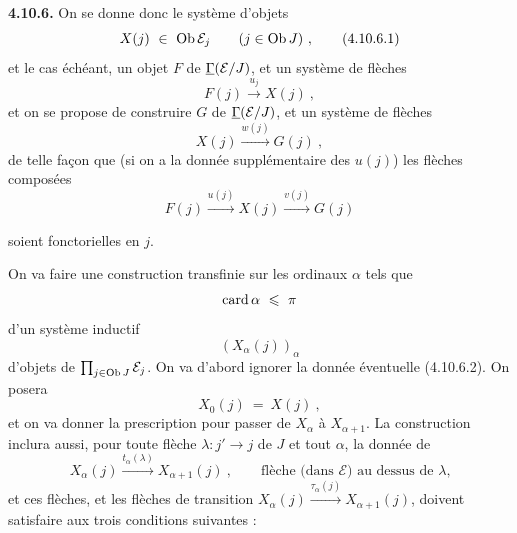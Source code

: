 \textbf{4.10.6.} On se donne donc le système d'objets
\[
X(j)\ \in\ \operatorname{Ob}\mathcal{E}_j \qquad (j\in\operatorname{Ob} J)\ , \tag*{(4.10.6.1)}
\]
et le cas échéant, un objet $F$ de $\underline{\Gamma}(\mathcal{E}/J)$, et un système de flèches
\[
F(j) \xrightarrow{u_j} X(j)\ , \tag*{(4.6.10.2)} %
\]
et on se propose de construire $G$ de $\underline{\Gamma}(\mathcal{E}/J)$, et un système de flèches
\[
X(j) \xrightarrow{w(j)} G(j)\ , \tag*{(4.10.6.3)}
\]
de telle façon que (si on a la donnée supplémentaire des $u(j)$) les flèches composées
\[
F(j) \xrightarrow{u(j)} X(j) \xrightarrow{v(j)} G(j) %
\]

soient fonctorielles en $j$.

On va faire une construction transfinie sur les ordinaux $\alpha$ tels que
\[
\card\alpha\ \leqslant\ \pi
\]
d'un système inductif
\[
(X_\alpha(j))_\alpha
\]
d'objets de $\prod_{j\in\operatorname{Ob} J}\mathcal{E}_j$. On va d'abord ignorer la donnée éventuelle (4.10.6.2). On posera
\[
X_0(j)\ =\ X(j)\ , \tag*{(4.10.6.4)}
\]
et on va donner la prescription pour passer de $X_\alpha$ à $X_{\alpha+1}$. La construction inclura aussi, pour toute flèche $\lambda : j'\longrightarrow j$ de $J$ et tout $\alpha$, la donnée de
\[
X_\alpha(j) \xrightarrow{t_\alpha(\lambda)} X_{\alpha+1}(j)\ , \qquad \text{flèche (dans $\mathcal{E}$) au dessus de $\lambda$,} \tag*{(4.10.6.5)} %
\]
et ces flèches, et les flèches de transition $X_\alpha(j)\xrightarrow{\tau_\alpha(j)}X_{\alpha+1}(j)$, doivent
satisfaire aux trois conditions suivantes :
